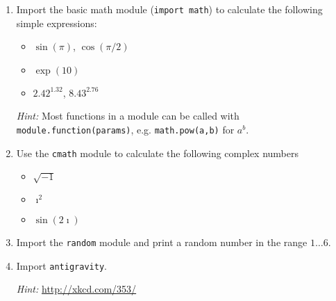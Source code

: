 \documentclass[smallheadings,12pt]{scrartcl}
\begin{document}
\begin{enumerate}
 \item Import the basic math module (\texttt{import math}) to calculate the following simple expressions:
\begin{itemize}
 \item $\sin(\pi)$, $\cos(\pi/2)$
 \item $\exp(10)$
 \item $2.42^{1.32}$, $8.43^{2.76}$
\end{itemize}
\textit{Hint:} Most functions in a module can be called with \texttt{module.function(params)}, e.g. \texttt{math.pow(a,b)} for $a^b$.
 \item Use the \texttt{cmath} module to calculate the following complex numbers
\begin{itemize}
 \item $\sqrt{-1}$
 \item $\imath^2$
 \item $\sin(2\imath)$
\end{itemize}

 \item Import the \texttt{random} module and print a random number in the range $1\dots6$.
 \item Import \texttt{antigravity}.


\textit{Hint:} \url{http://xkcd.com/353/}
\end{enumerate}
\end{document}
